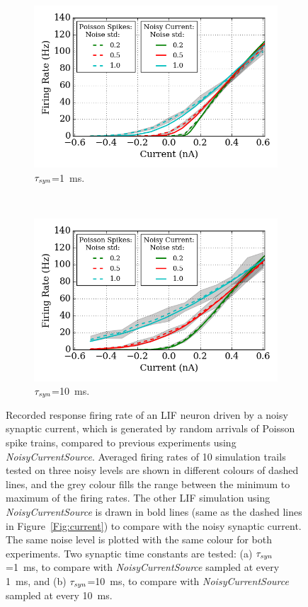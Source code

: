 	\begin{figure}[tbp!]
		\centering
		\begin{subfigure}[t]{0.7\textwidth}
			\includegraphics[width=\textwidth]{pics_iconip/revise_spike_curve-1.png}
			\caption{$\tau_{\textit{\textrm{syn}}}$=1~ms.}
		\end{subfigure}\\
		\begin{subfigure}[t]{0.7\textwidth}
			\includegraphics[width=\textwidth]{pics_iconip/revise_spike_curve-2.png}
			\caption{$\tau_{\textit{\textrm{syn}}}$=10~ms.}
		\end{subfigure}
		\caption[Recorded response firing rate driven by a noisy synaptic current.]{Recorded response firing rate of an LIF neuron driven by a noisy synaptic current, which is generated by random arrivals of Poisson spike trains, compared to previous experiments using \textit{NoisyCurrentSource}. Averaged firing rates of 10 simulation trails tested on three noisy levels are shown in different colours of dashed lines, and the grey colour fills the range between the minimum to maximum of the firing rates. The other LIF simulation using \textit{NoisyCurrentSource} is drawn in bold lines (same as the dashed lines in Figure~\ref{Fig:current}) to compare with the noisy synaptic current. The same noise level is plotted with the same colour for both experiments. Two synaptic time constants are tested: (a) $\tau_{\textit{\textrm{syn}}}$=1~ms, to compare with \textit{NoisyCurrentSource} sampled at every 1~ms, and (b) $\tau_{\textit{\textrm{syn}}}$=10~ms, to compare with \textit{NoisyCurrentSource} sampled at every 10~ms.}

\end{figure}
